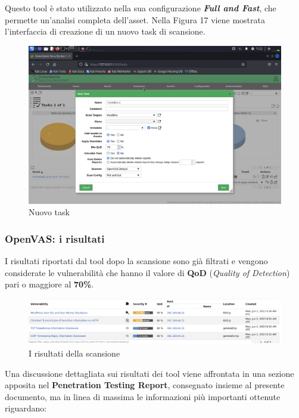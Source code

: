 \documentclass[a4paper, 12pt, oneside]{article}
\begin{document}
Questo tool è stato utilizzato nella sua configurazione \textbf{\textit{Full and Fast}}, che permette un'analisi completa dell'asset. Nella Figura 17 viene mostrata l'interfaccia di creazione di un nuovo task di scansione.

\begin{figure}[h!]
    \centering
    \includegraphics[width=\textwidth]{img/openvas-scan-task.png}
    \caption{Nuovo task}
\end{figure}

\subsubsection{OpenVAS: i risultati}
I risultati riportati dal tool dopo la scansione sono già filtrati e vengono considerate le vulnerabilità che hanno il valore di \textbf{QoD} (\textit{Quality of Detection}) pari o maggiore al \textbf{70\%}.

\begin{figure}[h!]
    \centering
    \includegraphics[width=\textwidth]{img/openvas-results.png}
    \caption{I risultati della scansione}
\end{figure}


Una discussione dettagliata sui risultati dei tool viene affrontata in una sezione apposita nel \textbf{Penetration Testing Report}, consegnato insieme al presente documento, ma in linea di massima le informazioni più importanti ottenute riguardano:
\end{document}
